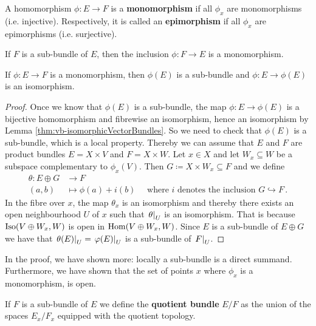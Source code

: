 \begin{definition}\label{def:vb-monoAndEpimorphisms}
	A homomorphism $\phi: E\to F$ is a \textbf{monomorphism} if all $\phi_x$ are monomorphisms (i.e. injective). Respectively, it is called an \textbf{epimorphism} if all $\phi_x$ are epimorphisms (i.e. surjective).
\end{definition}
\begin{corollary}
	If $F$ is a sub-bundle of $E$, then the inclusion $\phi:F\to E$ is a monomorphism.
\end{corollary}
\begin{lemma} \label{lem:vb-monosInduceSubBundles}
	If $\phi:E \to F$ is a monomorphism, then $\phi(E)$ is a sub-bundle and $\phi:E\to \phi(E)$ is an isomorphism.
\end{lemma}
\begin{proof}
	Once we know that $\phi(E)$ is a sub-bundle, the map $\phi:E\to \phi(E)$ is a bijective homomorphism and fibrewise an isomorphism, hence an isomorphism by Lemma \ref{thm:vb-isomorphicVectorBundles}. So we need to check that $\phi(E)$ is a sub-bundle, which is a local property. Thereby we can assume that $E$ and $F$ are product bundles $E=X\times V$ and $F=X\times W$. Let $x\in X$ and let $W_x\subseteq W$ be a subspace complementary to $\phi_x(V)$. Then $G\coloneq X\times W_x\subseteq F$ and we define
	\begin{align*}
		\theta:E\oplus G &\to F\\
		(a,b)&\mapsto \phi(a)+i(b)\quad \text{ where $i$ denotes the inclusion }G\hookrightarrow F \, .
	\end{align*} In the fibre over $x$, the map $\theta_x$ is an isomorphism and thereby there exists an open neighbourhood $U$ of $x$ such that $\left.\theta\right|_{U}$ is an isomorphism. That is because $\operatorname{\mathrm{Iso}}(V\oplus W_x,W)$ is open in $\operatorname{\mathrm{Hom}}(V\oplus W_x,W)$. Since $E$ is a sub-bundle of $E\oplus G$ we have that $\left.\theta(E)\right|_{U}=\left.\varphi(E)\right|_{U}$ is a sub-bundle of $\left.F\right|_{U}$.
\end{proof}
\begin{corollary}\label{cor:vb-subBundlesAreLocalSummands}
	In the proof, we have shown more: locally a sub-bundle is a direct summand. Furthermore, we have shown that the set of points $x$ where $\phi_x$ is a monomorphism, is open.
\end{corollary}
\begin{definition}\label{def:vb-quotientBundle}
	If $F$ is a sub-bundle of $E$ we define the \textbf{quotient bundle} $E\slash F$ as the union of the spaces $E_x\slash F_x$ equipped with the quotient topology.
\end{definition}

